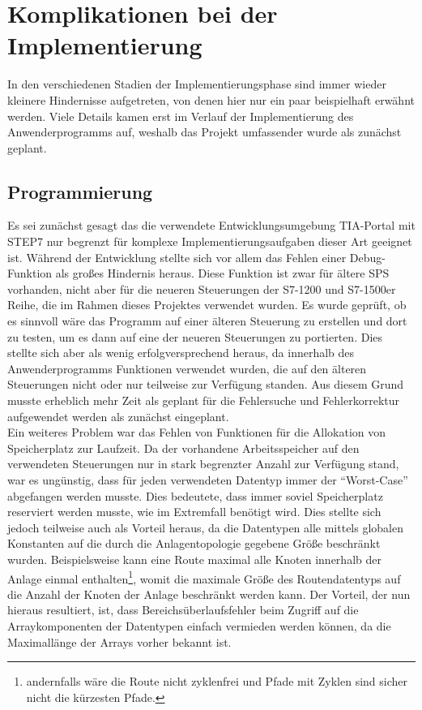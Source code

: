 \section{Komplikationen bei der Implementierung}

	In den verschiedenen Stadien der Implementierungsphase sind immer wieder kleinere Hindernisse aufgetreten, von denen hier nur ein paar beispielhaft erwähnt werden. Viele Details kamen erst im Verlauf der Implementierung des Anwenderprogramms auf, weshalb das Projekt umfassender wurde als zunächst geplant. 
	
	\subsection{Programmierung}
		
		Es sei zunächst gesagt das die verwendete Entwicklungsumgebung \ac{TIA-Portal} mit \ac{STEP7} nur begrenzt für komplexe Implementierungsaufgaben dieser Art geeignet ist. Während der Entwicklung stellte sich vor allem das Fehlen einer Debug-Funktion als großes Hindernis heraus. Diese Funktion ist zwar für ältere \ac{SPS} vorhanden, nicht aber für die neueren Steuerungen der S7-1200 und S7-1500er Reihe, die im Rahmen dieses Projektes verwendet wurden. Es wurde geprüft, ob es sinnvoll wäre das Programm auf einer älteren Steuerung zu erstellen und dort zu testen, um es dann auf eine der neueren Steuerungen zu portierten. Dies stellte sich aber als wenig erfolgversprechend heraus, da innerhalb des Anwenderprogramms Funktionen verwendet wurden, die auf den älteren Steuerungen nicht oder nur teilweise zur Verfügung standen. Aus diesem Grund musste erheblich mehr Zeit als geplant für die Fehlersuche und Fehlerkorrektur aufgewendet werden als zunächst eingeplant.
		\\[4pt]
		Ein weiteres Problem war das Fehlen von Funktionen für die Allokation von Speicherplatz zur Laufzeit. Da der vorhandene Arbeitsspeicher auf den verwendeten Steuerungen nur in stark begrenzter Anzahl zur Verfügung stand, war es ungünstig, dass für jeden verwendeten  Datentyp immer der "`Worst-Case"' abgefangen werden musste. Dies bedeutete, dass immer soviel Speicherplatz reserviert werden musste, wie im Extremfall benötigt wird. Dies stellte sich jedoch teilweise auch als Vorteil heraus, da die Datentypen alle mittels globalen Konstanten auf die durch die Anlagentopologie gegebene Größe beschränkt wurden. Beispielsweise kann eine Route maximal alle Knoten innerhalb der Anlage einmal enthalten\footnote{andernfalls wäre die Route nicht zyklenfrei und Pfade mit Zyklen sind sicher nicht die kürzesten Pfade.}, womit die maximale Größe des Routendatentyps auf die Anzahl der Knoten der Anlage beschränkt werden kann. Der Vorteil, der nun hieraus resultiert, ist, dass Bereichsüberlaufsfehler beim Zugriff auf die Arraykomponenten der Datentypen einfach vermieden werden können, da die Maximallänge der Arrays vorher bekannt ist.
